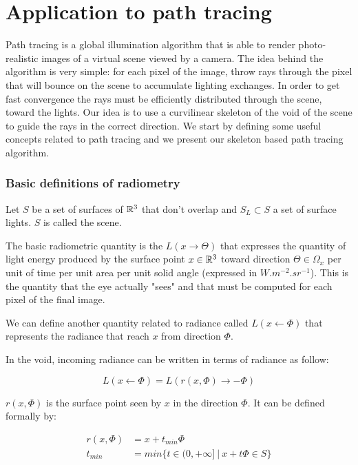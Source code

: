 

\section{Application to path tracing}

Path tracing is a global illumination algorithm that is able to render photo-realistic images of a virtual scene viewed by a camera. The idea behind the algorithm is very simple: for each pixel of the image, throw rays through the pixel that will bounce on the scene to accumulate lighting exchanges. In order to get fast convergence the rays must be efficiently distributed through the scene, toward the lights. Our idea is to use a curvilinear skeleton of the void of the scene to guide the rays in the correct direction. We start by defining some useful concepts related to path tracing and we present our skeleton based path tracing algorithm.

\subsubsection{Basic definitions of radiometry}

Let $S$ be a set of surfaces of $\mathbb{R}^3$ that don't overlap and $S_L \subset S$ a set of surface lights. $S$ is called the scene.

The basic radiometric quantity is the  $L(x \rightarrow \Theta)$ that expresses the quantity of light energy produced by the surface point $x \in \mathbb{R}^3$ toward direction $\Theta \in \Omega_x$ per unit of time per unit area per unit solid angle (expressed in $W.m^{-2}.sr^{-1}$).
This is the quantity that the eye actually "sees" and that must be computed for each pixel of the final image.


We can define another quantity related to radiance called  $L(x \leftarrow \Phi)$ that represents the radiance that reach $x$ from direction $\Phi$.

In the void, incoming radiance can be written in terms of radiance as follow:

\begin{equation*}
L(x \leftarrow \Phi) = L(r(x, \Phi) \rightarrow -\Phi)
\end{equation*}

$r(x, \Phi)$ is the surface point seen by $x$ in the direction $\Phi$. It can be defined formally by:

\begin{align*}
r(x, \Phi) &= x + t_{min}\Phi \\
t_{min} &= min \lbrace t \in (0, +\infty]~ |~ x + t\Phi \in S \rbrace
\end{align*}

